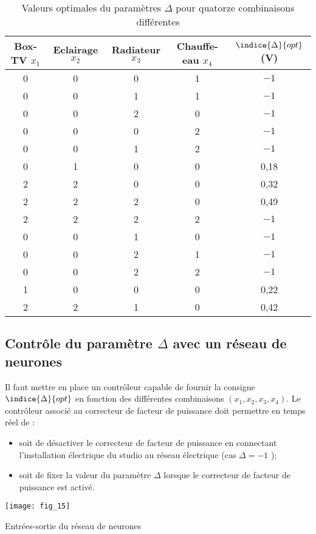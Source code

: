 \begin{table}[!h]
\centering
\begin{tabular}{ccccc}
\hline
Box-TV $x_1$ & Eclairage $x_2$ & Radiateur $x_3$ & Chauffe-eau $x_4$ & $\indice{\Delta}{opt}$ (V) \\
\hline
0 	& 0 	& 0 	& 1 	& $-1$ \\
0 	& 0	& 1 	& 1	& $-1$ \\
0 	& 0 	& 2 	& 0 	& $-1$ \\
0 	& 0 	& 0	& 2	& $-1$ \\
0 	& 0 	& 1	& 2	& $-1$ \\
0 	& 1 	& 0	& 0	& 0,18\\
2	& 2 	& 0	& 0	& 0,32\\
2	& 2 	& 2	& 0	& 0,49\\
2	& 2 	& 2	& 2	& $-1$ \\
\hline
\hline
0	& 0 	& 1	& 0	& $-1$ \\
0	& 0 	& 2	& 1	& $-1$ \\
0	& 0 	& 2	& 2	& $-1$ \\
1	& 0 	& 0	& 0 	& 0,22 \\
2	& 2 	& 1	& 0	& 0,42 \\
\hline
\end{tabular}
\caption{Valeurs optimales du paramètres $\Delta$ pour quatorze combinaisons différentes \label{Cy_07_ch_02_td_01_tab_03}}
\end{table}



\subsection*{Contrôle du paramètre $\Delta$ avec un réseau de neurones}
Il faut mettre en place un contrôleur capable de fournir la consigne $\indice{\Delta}{opt}$ en fonction des différentes combinaisons $\left(x_1, x_2, x_3, x_4 \right)$. Le contrôleur associé au correcteur de facteur de puissance doit permettre en temps réel de : 
\begin{itemize}
\item soit de désactiver le correcteur de facteur de puissance en connectant l'installation électrique du studio au réseau électrique (cas $\Delta = -1$ );
\item soit de fixer la valeur du paramètre $\Delta$ lorsque le correcteur de facteur de puissance est activé.
\end{itemize}

\begin{marginfigure}
\centering
\texttt{[image: fig\_15]}
\caption{Entrées-sortie du réseau de neurones\label{Cy_07_ch_02_td_01_fig_15}}
\end{marginfigure}

